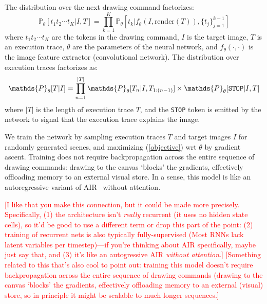 \documentclass{article}
\newcommand{\probability}{\mathds{P}} %
\newcommand{\remark}[1]{\textcolor{red}{[#1]}}
\begin{document}
The distribution over the next drawing command factorizes:
\begin{equation}
  \probability_\theta [t_1t_2\cdots t_K | I,T] = \prod_{k = 1}^K \probability_\theta [t_k | f_\theta(I,\text{render}(T)), \{t_j\}_{j = 1}^{k - 1}]
\end{equation}
where $t_1t_2\cdots t_K$ are the tokens in the drawing command, $I$ is
the target image, $T$ is an execution trace, $\theta$ are the
parameters of the neural network, and $f_\theta(\cdot,\cdot)$ is the
image feature extractor (convolutional network). The distribution over
execution traces factorizes as:
\begin{equation}
  \probability_\theta [T|I] = \prod_{n = 1}^{|T|} \probability_\theta [T_n | I,T_{1:(n-1)}]\times\probability_\theta [\verb|STOP| | I,T]\label{objective}
\end{equation}
where $|T|$ is the length of execution trace $T$, and the \verb|STOP|
token is emitted by the network to signal that the execution trace
explains the image.

We train the network by sampling execution traces $T$ and target
images $I$ for randomly generated scenes, and maximizing
(\ref{objective}) wrt $\theta$ by gradient ascent.
Training does not require backpropagation across the entire sequence of drawing commands:
drawing to the canvas `blocks' the gradients,
effectively offloading memory to an external visual store.
In a sense, this model is like an autoregressive variant of AIR~\cite{eslami1603attend} without attention.

\remark{I like that you make this connection, but it could be made more precisely. Specifically, (1) the architecture isn't \emph{really} recurrent (it uses no hidden state cells), so it'd be good to use a different term or drop this part of the point: (2) training of recurrent nets is also typically fully-supervised (Most RNNs lack latent variables per timestep)---if you're thinking about AIR specifically, maybe just say that, and (3) it's like an autogressive AIR \emph{without attention}.}
\remark{Something related to this that's also cool to point out: training this model doesn't require backpropagation across the entire sequence of drawing commands (drawing to the canvas `blocks' the gradients, effectively offloading memory to an external (visual) store, so in principle it might be scalable to much longer sequences.}
\end{document}

